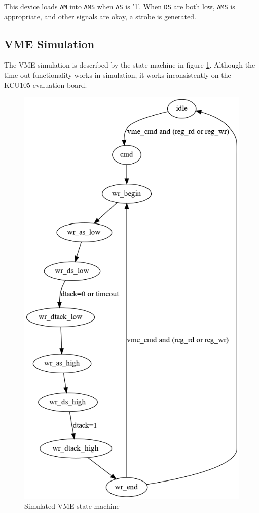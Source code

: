 \documentclass[10pt,a4paper]{article}
\begin{document}
This device loads \texttt{AM} into \texttt{AMS} when \texttt{AS} is '1'. When \texttt{DS} are both low, \texttt{AMS} is appropriate, and other signals are okay, a strobe is generated.

\subsection{VME Simulation}

The VME simulation is described by the state machine in figure \ref{fig:vmestatemachine}. Although the time-out functionality works in simulation, it works inconsistently on the KCU105 evaluation board. 

\begin{figure}[H]
\includegraphics[width= 0.4 \textwidth]{figures/vmestates.png}
\caption{Simulated VME state machine}
\label{fig:vmestatemachine}
\end{figure}

%
%
\end{document}
